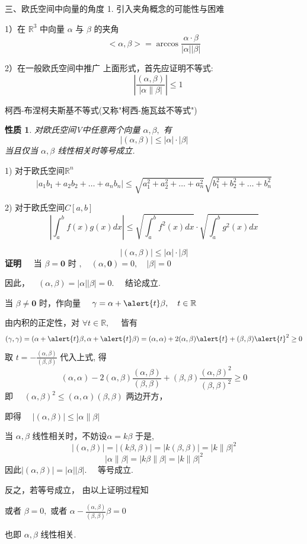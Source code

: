 \documentclass[13pt]{beamer}
\newtheorem*{prop}{性质}
\def\pf{{\bf 证明~~ }}
\begin{document}
\begin{frame}{三、欧氏空间中向量的角度}
1. 引入夹角概念的可能性与困难

1）在 $\mathbb{R}^{3}$ 中向量 $\alpha$ 与 $\beta$ 的夹角
\[
<\alpha, \beta>=\arccos \frac{\alpha \cdot \beta}{|\alpha||\beta|}
\]

2）在一般欧氏空间中推广
上面形式，首先应证明不等式: 
$$\quad\left|\frac{ ( \alpha, \beta)}{|\alpha \| \beta|}\right| \leq 1$$
\end{frame}


\begin{frame}{柯西-布涅柯夫斯基不等式(又称"柯西-施瓦兹不等式")}
\begin{prop}
对欧氏空间V中任意两个向量 $\alpha, \beta,$ 有
\[
| \left(\alpha, \beta \right) | \leq |\alpha|   \cdot | \beta|
\]
当且仅当 $\alpha, \beta$ 线性相关时等号成立.
\end{prop}

1) 对于欧氏空间$\mathbb{R}^n$
$$\left|a_{1} b_{1}+a_{2} b_{2}+\dots+a_{n} b_{n}\right|
\leq \sqrt{a_{1}^{2}+a_{2}^{2}+\dots+a_{n}^{2}}   \sqrt{b_{1}^{2}+b_{2}^{2}+\dots+b_{n}^{2}}$$

2) 对于欧氏空间$C[a,b]$
$$\left|\int_{a}^{b} f(x) g(x) d x\right| \leq \sqrt{\int_{a}^{b} f^{2}(x) d x}  \cdot  \sqrt{\int_{a}^{b} g^{2}(x) d x}$$
\end{frame}

\begin{frame}
\[
|(\alpha, \beta)| \leq |\alpha|   \cdot | \beta|
\]
\pf
当 $\beta=\mathbf{0}$ 时 $, \quad(\alpha, \mathbf{0})=0, \quad|\beta|=0$

因此，$ \quad(\alpha, \beta)=|\alpha||\beta|=0 . \quad$ 结论成立.

当 $\beta \neq \mathbf{0}$ 时，作向量 $\quad \gamma=\alpha+ \alert{t} \beta, \quad t  \in \mathbb{R}$

由内积的正定性，对 $\forall t \in \mathbb{R}, \quad$ 皆有
$$(\gamma, \gamma)=(\alpha+ \alert{t} \beta, \alpha+\alert{t} \beta)
=(\alpha, \alpha)+2(\alpha, \beta) \alert{t}+(\beta, \beta) \alert{t}^{2} \geq 0 $$
取 $t=-\frac{(\alpha, \beta)}{(\beta, \beta)} $
 代入上式, 得  
$$(\alpha, \alpha)-2(\alpha, \beta) \frac{(\alpha, \beta)}{(\beta, \beta)}+(\beta, \beta) \frac{(\alpha, \beta)^{2}}{(\beta, \beta)^{2}} \geq 0$$
即 $\quad(\alpha, \beta)^{2} \leq(\alpha, \alpha)(\beta, \beta)$
两边开方，

即得 $\quad|(\alpha, \beta)| \leq|\alpha \| \beta|$
\end{frame}

\begin{frame}
当
$\alpha, \beta$ 线性相关时，不妨设$\alpha=k \beta$
于是, $$|(\alpha, \beta)|=|(k \beta, \beta)|=|k(\beta, \beta)|=|k \| {\beta}|^{2}$$
$$
|\alpha\|\beta|=| k \beta\| \beta|=|k \| \beta|^{2}
$$
因此$|(\alpha, \beta)|=|\alpha||\beta| . \quad$ 等号成立.

反之，若等号成立，
由以上证明过程知

或者 $\beta=0,$ 或者 $\alpha-\frac{(\alpha, \beta)}{(\beta, \beta)} \beta=0$

也即 $\alpha, \beta$ 线性相关.

\end{frame}
\end{document}
